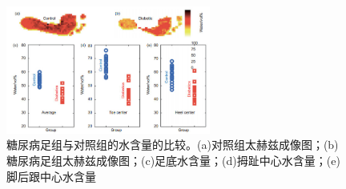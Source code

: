 \begin{figure}[htbp]
	\centering
	\includegraphics[width=0.6\textwidth]{img/img4.jpg} %
	\caption{糖尿病足组与对照组的水含量的比较。(a)对照组太赫兹成像图；(b)糖尿病足组太赫兹成像图；(c)足底水含量；(d)拇趾中心水含量；(e)脚后跟中心水含量\cite{hernandez2017terahertz}}
	\label{fig:example}
\end{figure}